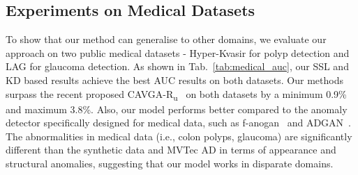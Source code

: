 \documentclass[final]{cvpr}
\begin{document}
\subsection{Experiments on Medical Datasets}

To show that our method can generalise to other domains, we evaluate our approach on two public medical datasets - Hyper-Kvasir for polyp detection and LAG for glaucoma detection. As shown in Tab.~\ref{tab:medical_auc}, our
SSL and KD based results achieve the best AUC results on both datasets. Our methods surpass the recent proposed CAVGA-R\textsubscript{u}~\cite{venkataramanan2019attention} on both datasets by a minimum 0.9\% and maximum 3.8\%. Also, our model  performs better compared to the anomaly detector specifically designed for medical data, such as f-anogan~\cite{f-anogan} and ADGAN~\cite{liu2019photoshopping}. The abnormalities in medical data (i.e., colon polyps, glaucoma) are significantly different than the synthetic data and MVTec AD in terms of appearance and structural anomalies, suggesting that our model works in disparate domains.

\begin{table}[h]
\centering
{}
\caption{\textbf{Anomaly detection:} AUC results on two medical datasets: Hyper-Kvasir and LAG. Best result in \textcolor{red}{\textbf{red}} and second best in \textcolor{blue}{\textbf{blue}}.}
\label{tab:medical_auc}
\end{table}
\end{document}
